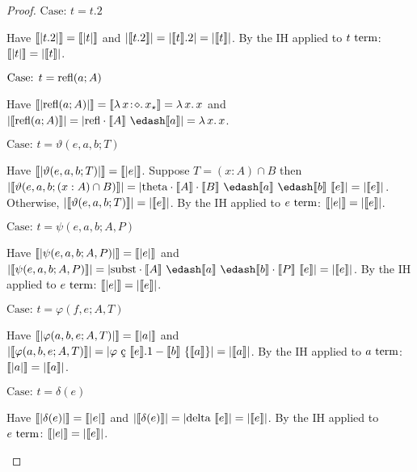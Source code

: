 \begin{proof}
    $\text{Case: }t = t.2$
    \begin{proofcase}
        Have $\llbracket |t.2| \rrbracket = \llbracket |t| \rrbracket$ and $|\llbracket t.2 \rrbracket| = |\llbracket t \rrbracket.2| = |\llbracket t \rrbracket|$.
        By the IH applied to $t~\textnormal{term}$: $\llbracket |t| \rrbracket = |\llbracket t \rrbracket|$.
    \end{proofcase}

    $\text{Case: }t = \textnormal{refl}(a; A)$
    \begin{proofcase}
        Have $\llbracket |\textnormal{refl}(a; A)| \rrbracket = \llbracket {\lambda}\, x\! : \! \diamond.\, x_\star \rrbracket = {\lambda}\, x.\, x$ and $|\sema{\prefl(a; A)}| = |\crefl \cdot \sema{A}\ \edash \sema{a}| = \absu{\lambda}{x}{x}$.
    \end{proofcase}

    $\text{Case: }t = \vartheta(e, a, b; T)$
    \begin{proofcase}
        Have $\llbracket |\vartheta(e, a, b; T)| \rrbracket = \llbracket |e| \rrbracket$.
        Suppose $T = (x : A) \cap B$ then $|\sema{\vartheta(e, a, b; (x : A) \cap B)}| = |\ctheta \cdot \sema{A} \cdot \sema{B}\ \edash \sema{a}\ \edash \sema{b}\ \sema{e}| = |\sema{e}|$.
        Otherwise, $|\llbracket \vartheta(e, a, b; T) \rrbracket| = |\llbracket e \rrbracket|$.
        By the IH applied to $e~\textnormal{term}$: $\llbracket |e| \rrbracket = |\llbracket e \rrbracket|$.
    \end{proofcase}

    $\text{Case: }t = \psi(e, a, b; A, P)$
    \begin{proofcase}
        Have $\llbracket |\psi(e, a, b; A, P)| \rrbracket = \llbracket |e| \rrbracket$ and $|\sema{\psi(e, a, b; A, P)}| = |\csubst \cdot \sema{A}\ \edash \sema{a}\ \edash \sema{b} \cdot \sema{P}\ \sema{e}| = |\sema{e}|$.
        By the IH applied to $e~\textnormal{term}$: $\llbracket |e| \rrbracket = |\llbracket e \rrbracket|$.
    \end{proofcase}

    $\text{Case: }t = \varphi(f, e; A, T)$
    \begin{proofcase}
        Have $\llbracket |\varphi(a, b, e; A, T)| \rrbracket = \llbracket |a| \rrbracket$ and $|\sema{\varphi(a, b, e; A, T)}| = |\varphi\ \text{\c{c}}\ \sema{e}.1 - \sema{b}\ \{ \sema{a} \}| = |\sema{a}|$.
        By the IH applied to $a~\textnormal{term}$: $\llbracket |a| \rrbracket = |\llbracket a \rrbracket|$.
    \end{proofcase}

    $\text{Case: }t = \delta(e)$
    \begin{proofcase}
        Have $\llbracket |\delta(e)| \rrbracket = \llbracket |e| \rrbracket$ and $|\llbracket \delta(e) \rrbracket| = |\textnormal{delta}\ \llbracket e \rrbracket| = |\llbracket e \rrbracket|$.
        By the IH applied to $e~\textnormal{term}$: $\llbracket |e| \rrbracket = |\llbracket e \rrbracket|$.
    \end{proofcase}
\end{proof}


